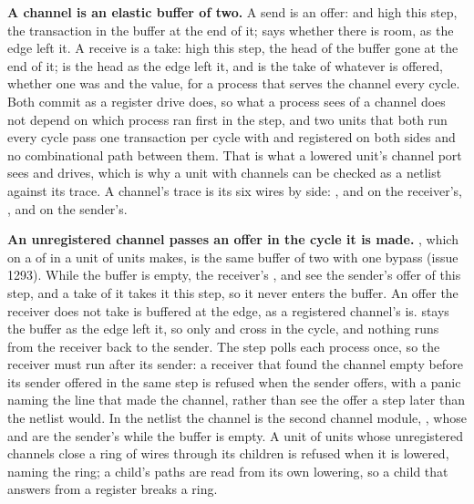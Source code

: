 \textbf{A channel is an elastic buffer of two.} A send is an offer:
 and  high this step, the transaction in the
buffer at the end of it;  says whether there is room, as
the edge left it. A receive is a take:  high this step,
the head of the buffer gone at the end of it;  is the head
as the edge left it, and  is the take of whatever is
offered, whether one was and the value, for a process that serves
the channel every cycle. Both commit as a register drive does, so what a
process sees of a channel does not depend on which process ran first
in the step, and two units that both run every cycle pass one
transaction per cycle with  and  registered
on both sides and no combinational path between them. That is what a
lowered unit's channel port sees and drives, which is why a unit with
channels can be checked as a netlist against its trace. A channel's
trace is its six wires by side: ,  and
 on the receiver's, , 
and  on the sender's.

\textbf{An unregistered channel passes an offer in the cycle it is
made.} , which \code{\#[unregistered]} on a
 of  in a unit of units makes, is the same
buffer of two with one bypass (issue 1293). While the buffer is empty,
the receiver's ,  and  see the
sender's offer of this step, and a take of it takes it this step, so it
never enters the buffer. An offer the receiver does not take is
buffered at the edge, as a registered channel's is.  stays
the buffer as the edge left it, so only  and 
cross in the cycle, and nothing runs from the receiver back to the
sender. The step polls each process once, so the receiver must run
after its sender: a receiver that found the channel empty before its
sender offered in the same step is refused when the sender offers, with
a panic naming the line that made the channel, rather than see the
offer a step later than the netlist would. In the netlist the channel
is the second channel module, , whose
 and  are the sender's while the buffer
is empty. A unit of units whose unregistered channels close a ring of
wires through its children is refused when it is lowered, naming the
ring; a child's paths are read from its own lowering, so a child that
answers from a register breaks a ring.

